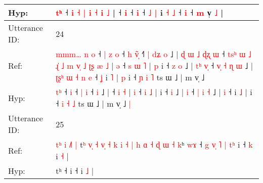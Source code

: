 \documentclass[10pt]{article}
\DeclareRobustCommand{\hl}[1]{{\textcolor{red}{#1}}}
\begin{document}
\begin{longtable}{ll}
 \\
Hyp: & \hl{}\hl{t}\hl{ʰ} ˧ \hl{i} \hl{˧} \hl{}\hl{|} \hl{i} \hl{˧} \hl{i} \hl{˩} |\hl{}\hl{}\hl{}\hl{}\hl{}\hl{} ˧\hl{}\hl{}\hl{} \hl{}\hl{i} ˧\hl{}\hl{}\hl{}\hl{} \hl{i} ˧\hl{}\hl{}\hl{}\hl{} \hl{˩} \hl{|} i\hl{}\hl{}\hl{}\hl{} \hl{}\hl{˧} \hl{˩} ˧\hl{}\hl{} \hl{}\hl{i} ˧ \hl{m} v̩ \hl{˩} |
 \\
\midrule
Utterance ID: & 24 \\
Ref: & \hl{m}\hl{m}\hl{m}\hl{…}\hl{ }\hl{n}\hl{ }\hl{o} ˧\hl{ }\hl{|}\hl{ }\hl{z} \hl{o} ˧ \hl{h} \hl{v}\hl{̃}\hl{̩} ˧\hl{˥}\hl{ }\hl{|}\hl{ }\hl{d}\hl{ʑ} \hl{o} ˩ |\hl{ }\hl{ɖ}\hl{ }\hl{ɯ}\hl{ }\hl{˩}\hl{ }\hl{ɖ}\hl{ʐ}\hl{ }\hl{ɯ} ˧\hl{ }\hl{t}\hl{s}\hl{ʰ}\hl{ }\hl{ɯ}\hl{ }\hl{˩}\hl{ }\hl{ɻ}\hl{̍}\hl{ }\hl{˩}\hl{ }\hl{m}\hl{ }\hl{v}\hl{̩}\hl{ }\hl{˩}\hl{ }\hl{ʈ}\hl{ʂ} \hl{æ} \hl{˩} | \hl{ə} ˧\hl{ }\hl{s} \hl{ɯ} \hl{˥} |\hl{ }\hl{p} i ˧\hl{ }\hl{z} \hl{o} ˩ |\hl{ }\hl{t}\hl{ʰ} \hl{v}\hl{̩} ˧\hl{ }\hl{v}\hl{̩} \hl{˧} \hl{ɳ} \hl{ɯ} ˩ |\hl{ }\hl{ʈ}\hl{ʂ}\hl{ʰ}\hl{ }\hl{ɯ}\hl{ }\hl{˧}\hl{ }\hl{n} \hl{e} ˧\hl{ }\hl{ʝ} i \hl{˥} |\hl{ }\hl{p} i ˧ \hl{ɲ} \hl{i} \hl{˥} ts ɯ ˩ | m v̩ ˩\hl{}\hl{}
 \\
Hyp: & \hl{}\hl{}\hl{}\hl{}\hl{}\hl{}\hl{t}\hl{ʰ} ˧\hl{}\hl{}\hl{}\hl{} \hl{i} ˧ \hl{|} \hl{}\hl{}\hl{i} ˧\hl{}\hl{}\hl{}\hl{}\hl{}\hl{} \hl{i} ˩ |\hl{}\hl{}\hl{}\hl{}\hl{}\hl{}\hl{}\hl{}\hl{}\hl{}\hl{} ˧\hl{}\hl{}\hl{}\hl{}\hl{}\hl{}\hl{}\hl{}\hl{}\hl{}\hl{}\hl{}\hl{}\hl{}\hl{}\hl{}\hl{}\hl{}\hl{}\hl{}\hl{}\hl{}\hl{} \hl{i} \hl{˧} | \hl{i} ˧\hl{}\hl{} \hl{i} \hl{˩} |\hl{}\hl{} i ˧\hl{}\hl{} \hl{i} ˩ |\hl{}\hl{}\hl{} \hl{}\hl{i} ˧\hl{}\hl{}\hl{} \hl{|} \hl{i} \hl{˧} ˩ |\hl{}\hl{}\hl{}\hl{}\hl{}\hl{}\hl{}\hl{}\hl{}\hl{} \hl{i} ˧\hl{}\hl{} i \hl{˩} |\hl{}\hl{} i ˧ \hl{i} \hl{˧} \hl{˩} ts ɯ ˩ | m v̩ ˩\hl{ }\hl{|}
 \\
\midrule
Utterance ID: & 25 \\
Ref: & \hl{t}\hl{ʰ}\hl{ }\hl{i}\hl{ }\hl{˩}\hl{˥}\hl{ }\hl{|}\hl{ }t\hl{ʰ}\hl{ }\hl{v}\hl{̩}\hl{ }\hl{˧}\hl{ }\hl{v}\hl{̩}\hl{ }\hl{˧}\hl{ }\hl{k}\hl{ }\hl{i}\hl{ }\hl{˧}\hl{ }\hl{|}\hl{ }\hl{h}\hl{ }\hl{ɑ}\hl{ }\hl{˧}\hl{ }\hl{ɖ}\hl{ }\hl{ɯ}\hl{ }\hl{˧}\hl{ }\hl{k}ʰ\hl{ }\hl{w}\hl{ɤ} ˧\hl{ }\hl{g}\hl{ }\hl{v}\hl{̩}\hl{ }\hl{˥}\hl{ }\hl{|}\hl{ }\hl{t}\hl{ʰ} i ˧\hl{ }\hl{k} i \hl{˧} |
 \\
Hyp: & \hl{}\hl{}\hl{}\hl{}\hl{}\hl{}\hl{}\hl{}\hl{}\hl{}t\hl{}\hl{}\hl{}\hl{}\hl{}\hl{}\hl{}\hl{}\hl{}\hl{}\hl{}\hl{}\hl{}\hl{}\hl{}\hl{}\hl{}\hl{}\hl{}\hl{}\hl{}\hl{}\hl{}\hl{}\hl{}\hl{}\hl{}\hl{}\hl{}\hl{}\hl{}\hl{}\hl{}ʰ\hl{}\hl{}\hl{} ˧\hl{}\hl{}\hl{}\hl{}\hl{}\hl{}\hl{}\hl{}\hl{}\hl{}\hl{}\hl{} i ˧\hl{}\hl{} i \hl{˩} |

\end{longtable}
\end{document}

